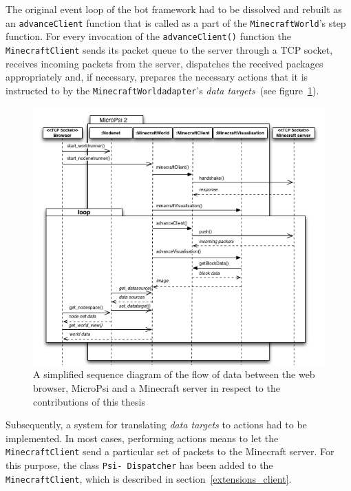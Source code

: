 The original event loop of the bot framework had to be dissolved and rebuilt as an \texttt{advanceClient} function that is called as a part of the \texttt{MinecraftWorld}'s step function. For every invocation of the \texttt{advanceClient()} function the \texttt{MinecraftClient} sends its packet queue to the server through a TCP socket, receives incoming packets from the server, dispatches the received packages appropriately and, if necessary, prepares the necessary actions that it is instructed to by the \texttt{MinecraftWorldadapter}'s \emph{data targets}~(see figure~\ref{spock_loop}).

\begin{figure}[h]
  \centering
    \includegraphics[width=15cm]{graphics/sequencediagram_v14}
  \caption[A simplified sequence diagram of the flow of data]{A simplified sequence diagram of the flow of data between the web browser, MicroPsi and a Minecraft server in respect to the contributions of this thesis}
  \label{spock_loop}
\end{figure}

Subsequently, a system for translating \emph{data targets} to actions had to be implemented. In most cases, performing actions means to let the \texttt{MinecraftClient} send a particular set of packets to the Minecraft server. For this purpose, the class \texttt{Psi- Dispatcher} has been added to the \texttt{MinecraftClient}, which is described in section~\ref{extensions_client}.


